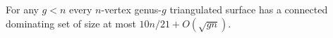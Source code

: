 \documentclass{beamer}
\begin{document}
\begin{frame}
For any $g<n$ every $n$-vertex genus-$g$ triangulated surface has a connected dominating set of size at most $10n/21 + O(\sqrt{gn})$.

  \begin{center}

\end{center}
\end{frame}
\end{document}
